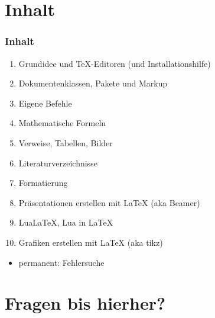 
\subtitle{Einführung}
\date{Sommersemester 2017}



\section{Inhalt}%
\begin{frame}[fragile]
  \frametitle{Inhalt}
  \begin{enumerate}%
  \item Grundidee und TeX-Editoren (und Installationshilfe)
  \item Dokumentenklassen, Pakete und Markup
  \item Eigene Befehle
  \item Mathematische Formeln
  \item Verweise, Tabellen, Bilder%
  \item Literaturverzeichnisse%
  \item Formatierung
  \item Präsentationen erstellen mit \LaTeX{} (aka Beamer)
  \item Lua\LaTeX, Lua in \LaTeX
  \item Grafiken erstellen mit \LaTeX{} (aka tikz)
  \end{enumerate}
  \begin{itemize}
    \item permanent: Fehlersuche
  \end{itemize}
\end{frame}

\section{Fragen bis hierher?}

